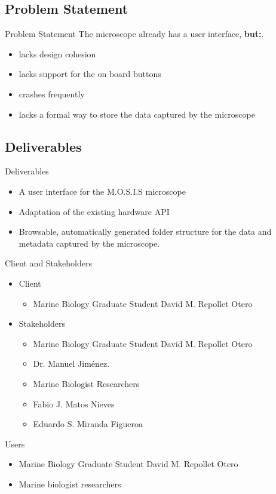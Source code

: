 \documentclass[14pt, aspectratio=169]{beamer}
\begin{document}
\subsection{Problem Statement}
\begin{frame}{Problem Statement}
	The microscope already has a user interface, \textbf{but:}.
	\begin{itemize}
		\item lacks design cohesion
		\item lacks support for the on board buttons
		\item crashes frequently
		\item lacks a formal way to store the data captured by the microscope
	\end{itemize}
\end{frame}
\subsection{Deliverables}
\begin{frame}{Deliverables}
	\begin{itemize}
		\item A user interface for the M.O.S.I.S microscope
		\item Adaptation of the existing hardware API
		\item Browsable, automatically generated folder structure for the data and metadata captured by the microscope.
	\end{itemize}
\end{frame}
\begin{frame}{Client and Stakeholders}
	\begin{itemize}
		\item Client
		      \begin{itemize}
			      \item Marine Biology Graduate Student David M. Repollet Otero
		      \end{itemize}
		\item Stakeholders
		      \begin{itemize}
			      \item Marine Biology Graduate Student David M. Repollet Otero
			      \item Dr. Manuel Jiménez.
			      \item Marine Biologist Researchers
			      \item Fabio J. Matos Nieves
			      \item Eduardo S. Miranda Figueroa
		      \end{itemize}
	\end{itemize}
\end{frame}
\begin{frame}{Users}
	\begin{itemize}
		\item Marine Biology Graduate Student David M. Repollet Otero
		\item Marine biologist researchers
	\end{itemize}
\end{frame}
\end{document}
